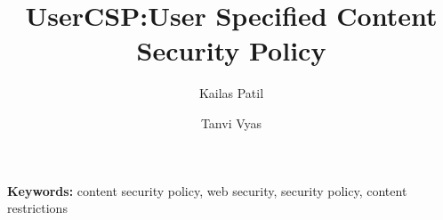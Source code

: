 \documentclass{llncs}
\begin{document}
\title{UserCSP:User Specified Content Security Policy}
 \author{Kailas Patil \and Tanvi Vyas \\
}

\maketitle



{\bf Keywords:} content security policy, web security, security policy, content restrictions 















\end{document}
